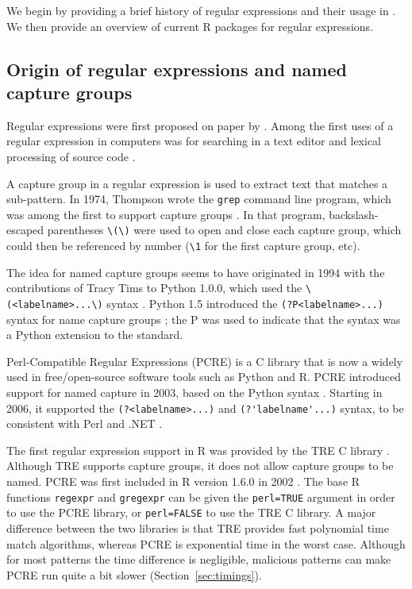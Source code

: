 We begin by providing a brief history of regular
expressions and their usage in \R. We then provide an overview of
current R packages for regular expressions.

\subsection{Origin of regular expressions and named capture groups}

Regular expressions were first proposed on paper
by \citet{Kleene56}. Among the first uses of a regular expression in
computers was for searching in a text editor \citep{Thompson68} and
lexical processing of source code \citep{Johnson68}. 

A capture group in a regular expression is used to extract text that
matches a sub-pattern. In 1974, Thompson wrote the \texttt{grep}
command line program, which was among the first to support capture
groups \citep{Friedl2002}. In that program, backslash-escaped
parentheses \verb|\(\)| were used to open and close each capture
group, which could then be referenced by number (\verb|\1| for the
first capture group, etc).

The idea for named capture groups seems to have originated in 1994
with the contributions of Tracy Tims to Python 1.0.0, which used the
\verb|\(<labelname>...\)| syntax
\citep{Python-1.5.2-Misc-HISTORY}. Python 1.5 introduced the
\verb|(?P<labelname>...)| syntax for name capture groups
\citep{python-1.5-Doc-libre.tex}; the P was used to indicate that the
syntax was a Python extension to the standard.

Perl-Compatible Regular Expressions (PCRE) is a C library that is now
a widely used in free/open-source software tools such as Python and R.
PCRE introduced support for named capture in 2003, based on the Python
syntax \citep{pcre1-changelog.txt}. Starting in 2006, it supported the
\verb|(?<labelname>...)| and \verb|(?'labelname'...)| syntax, to be
consistent with Perl and .NET \citep{pcre1-changelog.txt}.

The first regular expression support in R was provided by the TRE C
library \citep{TRE}. Although TRE supports capture groups, it does not
allow capture groups to be named. PCRE was first included in R version
1.6.0 in 2002 \citep{R.NEWS.1.txt}. The base R functions
\verb|regexpr| and \verb|gregexpr| can be given the \verb|perl=TRUE|
argument in order to use the PCRE library, or \verb|perl=FALSE| to use
the TRE C library. A major difference between the two libraries is
that TRE provides fast polynomial time match algorithms, whereas PCRE
is exponential time in the worst case. Although for most patterns the
time difference is negligible, malicious patterns can make PCRE run
quite a bit slower (Section~\ref{sec:timings}).

